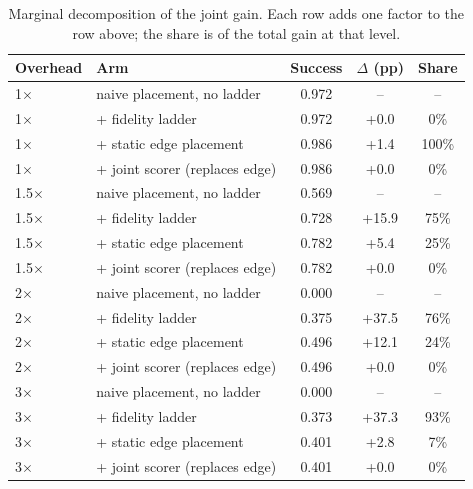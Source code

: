\begin{table}[t]
\centering
\footnotesize
\caption{Marginal decomposition of the joint gain. Each row adds one factor to the row above; the share is of the total gain at that level.}
\label{tab:p2-partition}
\begin{tabular}{llccc}
\toprule
Overhead & Arm & Success & $\Delta$ (pp) & Share \\
\midrule
1$\times$ & naive placement, no ladder & 0.972 & -- & -- \\
1$\times$ & + fidelity ladder & 0.972 & +0.0 & 0\% \\
1$\times$ & + static edge placement & 0.986 & +1.4 & 100\% \\
1$\times$ & + joint scorer (replaces edge) & 0.986 & +0.0 & 0\% \\
1.5$\times$ & naive placement, no ladder & 0.569 & -- & -- \\
1.5$\times$ & + fidelity ladder & 0.728 & +15.9 & 75\% \\
1.5$\times$ & + static edge placement & 0.782 & +5.4 & 25\% \\
1.5$\times$ & + joint scorer (replaces edge) & 0.782 & +0.0 & 0\% \\
2$\times$ & naive placement, no ladder & 0.000 & -- & -- \\
2$\times$ & + fidelity ladder & 0.375 & +37.5 & 76\% \\
2$\times$ & + static edge placement & 0.496 & +12.1 & 24\% \\
2$\times$ & + joint scorer (replaces edge) & 0.496 & +0.0 & 0\% \\
3$\times$ & naive placement, no ladder & 0.000 & -- & -- \\
3$\times$ & + fidelity ladder & 0.373 & +37.3 & 93\% \\
3$\times$ & + static edge placement & 0.401 & +2.8 & 7\% \\
3$\times$ & + joint scorer (replaces edge) & 0.401 & +0.0 & 0\% \\
\bottomrule
\end{tabular}
\par\vspace{2pt}{\footnotesize\raggedright At $1.5\times$ and above the ladder is worth 75--93\% of the joint gain, the static edge tier most of the remainder, and the joint scorer nothing once the edge tier is available. At nominal overhead no arm is stressed, so the shares are meaningless there and the row is reported for completeness.\par}
\end{table}
